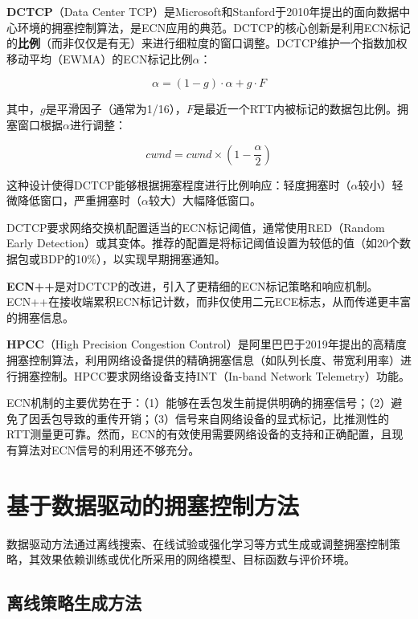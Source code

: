\textbf{DCTCP}（Data Center TCP）是Microsoft和Stanford于2010年提出的面向数据中心环境的拥塞控制算法，是ECN应用的典范。DCTCP的核心创新是利用ECN标记的\textbf{比例}（而非仅仅是有无）来进行细粒度的窗口调整。DCTCP维护一个指数加权移动平均（EWMA）的ECN标记比例$\alpha$：

\begin{equation}
\alpha = (1 - g) \cdot \alpha + g \cdot F
\end{equation}

其中，$g$是平滑因子（通常为1/16），$F$是最近一个RTT内被标记的数据包比例。拥塞窗口根据$\alpha$进行调整：

\begin{equation}
cwnd = cwnd \times (1 - \frac{\alpha}{2})
\end{equation}

这种设计使得DCTCP能够根据拥塞程度进行比例响应：轻度拥塞时（$\alpha$较小）轻微降低窗口，严重拥塞时（$\alpha$较大）大幅降低窗口。

DCTCP要求网络交换机配置适当的ECN标记阈值，通常使用RED（Random Early Detection）或其变体。推荐的配置是将标记阈值设置为较低的值（如20个数据包或BDP的10\%），以实现早期拥塞通知。

\textbf{ECN++}是对DCTCP的改进，引入了更精细的ECN标记策略和响应机制。ECN++在接收端累积ECN标记计数，而非仅使用二元ECE标志，从而传递更丰富的拥塞信息。

\textbf{HPCC}（High Precision Congestion Control）是阿里巴巴于2019年提出的高精度拥塞控制算法，利用网络设备提供的精确拥塞信息（如队列长度、带宽利用率）进行拥塞控制。HPCC要求网络设备支持INT（In-band Network Telemetry）功能。

ECN机制的主要优势在于：（1）能够在丢包发生前提供明确的拥塞信号；（2）避免了因丢包导致的重传开销；（3）信号来自网络设备的显式标记，比推测性的RTT测量更可靠。然而，ECN的有效使用需要网络设备的支持和正确配置，且现有算法对ECN信号的利用还不够充分。

\section{基于数据驱动的拥塞控制方法}

数据驱动方法通过离线搜索、在线试验或强化学习等方式生成或调整拥塞控制策略，其效果依赖训练或优化所采用的网络模型、目标函数与评价环境。

\subsection{离线策略生成方法}

